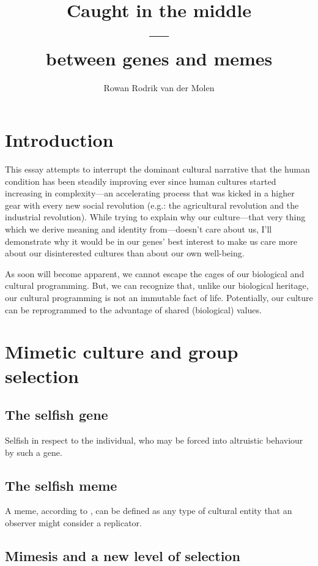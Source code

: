 \documentclass{article}
\title{Caught in the middle\\---\\between genes and memes}
\author{Rowan Rodrik van der Molen}
\begin{document}
\maketitle

\tableofcontents

\section{Introduction}
\label{sec:intro}

This essay attempts to interrupt the dominant cultural narrative that the human condition has been steadily improving ever since human cultures started increasing in complexity---an accelerating process that was kicked in a higher gear with every new social revolution (e.g.: the agricultural revolution and the industrial revolution). While trying to explain why our culture---that very thing which we derive meaning and identity from---doesn't care about us, I'll demonstrate why it would be in our genes' best interest to make us care more about our disinterested cultures than about our own well-being.

As soon will become apparent, we cannot escape the cages of our biological and cultural programming. But, we can recognize that, unlike our biological heritage, our cultural programming is not an immutable fact of life. Potentially, our culture can be reprogrammed to the advantage of shared (biological) values.

\section{Mimetic culture and group selection}
\label{sec:mimesis}

\subsection{The selfish gene}
\label{sec:genes}

Selfish in respect to the individual, who may be forced into altruistic behaviour by such a gene.

\subsection{The selfish meme}
\label{sec:memes}

A meme, according to \citet{dawkins1976}, can be defined as any type of cultural entity that an observer might consider a replicator.

\subsection{Mimesis and a new level of selection}
\end{document}

